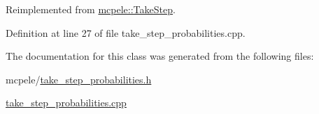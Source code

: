 \-Reimplemented from \hyperlink{classmcpele_1_1TakeStep_aac4f30de62c4cbc4d9d31c7629742f64}{mcpele\-::\-Take\-Step}.



\-Definition at line 27 of file take\-\_\-step\-\_\-probabilities.\-cpp.



\-The documentation for this class was generated from the following files\-:\begin{DoxyCompactItemize}
\item 
mcpele/\hyperlink{take__step__probabilities_8h}{take\-\_\-step\-\_\-probabilities.\-h}\item 
\hyperlink{take__step__probabilities_8cpp}{take\-\_\-step\-\_\-probabilities.\-cpp}\end{DoxyCompactItemize}
